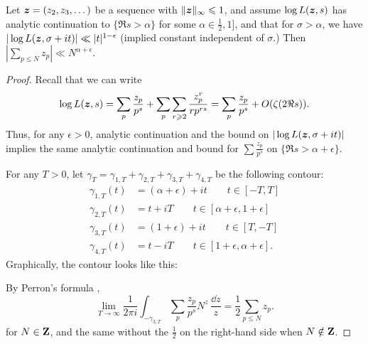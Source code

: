 \begin{theorem}\label{thm:RH->bound}
Let ${\boldsymbol z}=(z_2,z_3,\dots)$ be a sequence with $\|{\boldsymbol z}\|_\infty\leqslant 1$, and 
assume $\log L({\boldsymbol z},s)$ has analytic continuation to $\{\Re s>\alpha\}$ for some 
$\alpha\in \frac 1 2,1]$, and that for $\sigma>\alpha$, we have 
$|\log L({\boldsymbol z},\sigma+i t)| \ll |t|^{1-\epsilon}$ (implied constant independent 
of $\sigma$.) Then $|\sum_{p\leqslant N} z_p| \ll N^{\alpha+\epsilon}$. 
\end{theorem}
\begin{proof}
Recall that we can write 
\[
	\log L({\boldsymbol z},s) = \sum_p \frac{z_p}{p^s} + \sum_p \sum_{r\geqslant 2} \frac{z_p^r}{r p^{r s}} = \sum_p \frac{z_p}{p^s} + O(\zeta(2 \Re s)) .
\]
Thus, for any $\epsilon>0$, analytic continuation and the bound on 
$|\log L({\boldsymbol z},\sigma+i t)|$ implies the same analytic continuation and bound for 
$\sum \frac{z_p}{p^s}$ on $\{\Re s>\alpha+\epsilon\}$. 

For any $T>0$, let 
$\gamma_T = \gamma_{1,T} + \gamma_{2,T} + \gamma_{3,T} + \gamma_{4,T}$ be the 
following contour: 
\begin{align*}
	\gamma_{1,T}(t) &= (\alpha+\epsilon)+i t\qquad t\in [-T,T] \\
	\gamma_{2,T}(t) &= t+i T \qquad t\in [\alpha+\epsilon,1+\epsilon] \\
	\gamma_{3,T}(t) &= (1+\epsilon) + i t \qquad t\in [T,-T] \\
	\gamma_{4,T}(t) &= t - i T \qquad t\in [1+\epsilon,\alpha+\epsilon] .
\end{align*}
Graphically, the contour looks like this: 
\begin{center}
\end{center}
By Perron's formula \cite[Th.~11.18]{apostol-1976}, 
\[
	\lim_{T\to \infty} \frac{1}{2\pi i} \int_{-\gamma_{3,T}} \sum_p \frac{z_p}{p^s} N^z\, \frac{\dd z}{z} = \frac 1 2 \sum_{p\leqslant N} z_p .
\]
for $N\in \mathbf{Z}$, and the same without the $\frac 1 2$ on the right-hand side 
when $N\notin \mathbf{Z}$. 


\end{proof}
